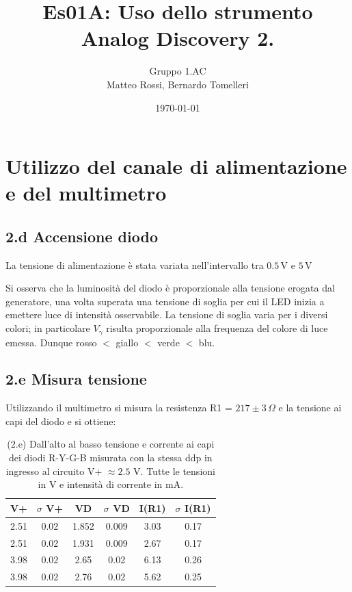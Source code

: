 \documentclass[10pt,a4paper]{article}
\author{Gruppo 1.AC \\ Matteo Rossi, Bernardo Tomelleri}
\title{Es01A: Uso dello strumento Analog Discovery 2.}
\begin{document}
\date{\today}
\maketitle

\setcounter{section}{1}

\section{Utilizzo del canale di alimentazione e del multimetro}

\subsection*{2.d Accensione diodo}

La tensione di alimentazione \`e stata variata nell'intervallo tra
$0.5\,\mathrm{V}$ e $5\,\mathrm{V}$


Si osserva che la luminosit\`a del diodo è proporzionale alla tensione
erogata dal generatore, una volta superata una tensione di soglia per cui
il LED inizia a emettere luce di intensità osservabile. La tensione di soglia
varia per i diversi colori; in particolare $V_\gamma$ risulta
proporzionale alla frequenza del colore di luce emessa. Dunque
rosso $<$ giallo $<$ verde $<$ blu.

\subsection*{2.e Misura tensione}
Utilizzando il multimetro si misura la resistenza R1 = $217 \pm 3 \,\Omega$
e la tensione ai capi del diodo e si ottiene:

\begin{table}[htb]
\centering
\begin{tabular}{|c|c|c|c|c|c|}
\hline
V+& $\sigma$ V+  & VD & $\sigma$ VD & I(R1)  & $\sigma$ I(R1) \\
\hline 
2.51 & 0.02 & 1.852 & 0.009 & 3.03 & 0.17 \\
2.51 & 0.02 & 1.931 & 0.009 & 2.67 & 0.17 \\
3.98 & 0.02 & 2.65 & 0.02 & 6.13 & 0.26 \\
3.98 & 0.02 & 2.76 & 0.02 & 5.62 & 0.25\\
\hline 
\end{tabular} 
\caption{(2.e) Dall'alto al basso tensione e corrente ai capi dei diodi
R-Y-G-B misurata con la stessa ddp in ingresso al circuito V+ $\approx 2.5$ V.
Tutte le tensioni in V e intensità di corrente in mA.\label{tab:VD-ID}}
\end{table}
\end{document}
